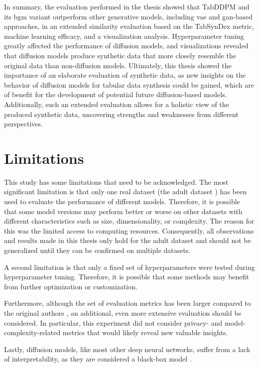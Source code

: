 In summary, the evaluation performed in the thesis showed that TabDDPM and its \gls{bgm} variant outperform other generative models,
including \gls{vae} and \gls{gan}-based approaches, in an extended similarity evaluation based on the TabSynDex metric,
machine learning efficacy, and a visualization analysis.
Hyperparameter tuning greatly affected the performance of diffusion models, and visualizations revealed that diffusion models produce synthetic data that more closely resemble the original data than non-diffusion models.
Ultimately, this thesis showed the importance of an elaborate evaluation of synthetic data, as new insights on the behavior of diffusion models for tabular data synthesis could be gained,
which are of benefit for the development of potential future diffusion-based models.
Additionally, such an extended evaluation allows for a holistic view of the produced synthetic data, uncovering strengths and weaknesses from different perspectives.
\newpage
\section{Limitations}
\label{ch:results-limitations}

This study has some limitations that need to be acknowledged.
The most significant limitation is that only one real dataset (the adult dataset \cite{Dua:2019}) has been used to evaluate the performance of different models.
Therefore, it is possible that some model versions may perform better or worse on other datasets with different characteristics such as size, dimensionality, or complexity.
The reason for this was the limited access to computing resources.
Consequently, all observations and results made in this thesis only hold for the adult dataset and should not be generalized until they can be confirmed on multiple datasets.

A second limitation is that only a fixed set of hyperparameters were tested during hyperparameter tuning.
Therefore, it is possible that some methods may benefit from further optimization or customization.

Furthermore, although the set of evaluation metrics has been larger compared to the original authors \cite{kotelnikov2022TabDDPMModellingTabular},
an additional, even more extensive evaluation should be considered.
In particular, this experiment did not consider privacy- and model-complexity-related metrics that would likely reveal new valuable insights.

Lastly, diffusion models, like most other deep neural networks, suffer from a lack of interpretability, as they are considered a black-box model \cite{benitez1997AreArtificialNeural}.